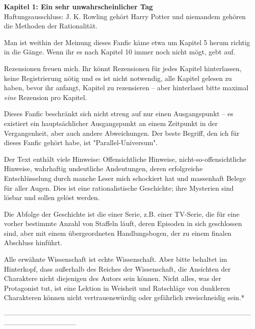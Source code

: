 

\hypertarget{ein-sehr-unwahrscheinlicher-tag}{%

\textbf{Kapitel 1: Ein sehr unwahrscheinlicher Tag}\\

Haftungsausschluss: J. K. Rowling gehört Harry Potter und niemandem gehören die Methoden der Rationalität.

Man ist weithin der Meinung dieses Fanfic käme etwa um Kapitel 5 herum richtig in die Gänge. Wenn ihr es nach Kapitel 10 immer noch nicht mögt, gebt auf.

Rezensionen freuen mich. Ihr könnt Rezensionen für jedes Kapitel hinterlassen, keine Registrierung nötig und es ist nicht notwendig, alle Kapitel gelesen zu haben, bevor ihr anfangt, Kapitel zu rezensieren -- aber hinterlasst bitte maximal \emph{eine} Rezension pro Kapitel.

Dieses Fanfic beschränkt sich nicht streng auf nur einen Ausgangspunkt -- es existiert ein hauptsächlicher Ausgangspunkt an einem Zeitpunkt in der Vergangenheit, aber auch andere Abweichungen. Der beste Begriff, den ich für dieses Fanfic gehört habe, ist "Parallel-Universum".

Der Text enthält viele Hinweise: Offensichtliche Hinweise, nicht-so-offensichtliche Hinweise, wahrhaftig undeutliche Andeutungen, deren erfolgreiche Entschlüsselung durch manche Leser mich schockiert hat und massenhaft Belege für aller Augen. Dies ist eine rationalistische Geschichte; ihre Mysterien sind lösbar und sollen gelöst werden.

Die Abfolge der Geschichte ist die einer Serie, z.B. einer TV-Serie, die für eine vorher bestimmte Anzahl von Staffeln läuft, deren Episoden in sich geschlossen sind, aber mit einem übergeordneten Handlungsbogen, der zu einem finalen Abschluss hinführt.

Alle erwähnte Wissenschaft ist echte Wissenschaft. Aber bitte behaltet im Hinterkopf, dass außerhalb des Reiches der Wissenschaft, die Ansichten der Charaktere nicht diejenigen des Autors sein können. Nicht alles, was der Protagonist tut, ist eine Lektion in Weisheit und Ratschläge von dunkleren Charakteren können nicht vertrauenswürdig oder gefährlich zweischneidig sein.*

--------------------------------------------------------------------------------------------------------------------------------------------

}
